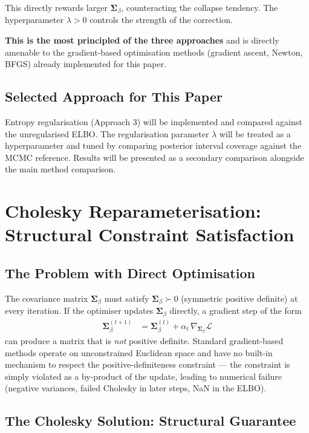\documentclass[11pt,a4paper]{article}
\begin{document}
This directly rewards larger $\bm{\Sigma}_\beta$, counteracting the collapse tendency. The hyperparameter $\lambda > 0$ controls the strength of the correction.

\textbf{This is the most principled of the three approaches} and is directly amenable to the gradient-based optimisation methods (gradient ascent, Newton, BFGS) already implemented for this paper.

\subsection*{Selected Approach for This Paper}

Entropy regularisation (Approach 3) will be implemented and compared against the unregularised ELBO. The regularisation parameter $\lambda$ will be treated as a hyperparameter and tuned by comparing posterior interval coverage against the MCMC reference. Results will be presented as a secondary comparison alongside the main method comparison.



\section{Cholesky Reparameterisation: Structural Constraint Satisfaction}\label{app:cholesky}

\subsection*{The Problem with Direct Optimisation}

The covariance matrix $\bm{\Sigma}_\beta$ must satisfy $\bm{\Sigma}_\beta \succ 0$ (symmetric positive definite) at every iteration. If the optimiser updates $\bm{\Sigma}_\beta$ directly, a gradient step of the form
\begin{align}
  \bm{\Sigma}_\beta^{(t+1)} &= \bm{\Sigma}_\beta^{(t)} + \alpha_t \,\nabla_{\bm{\Sigma}_\beta}\mathcal{L}
\end{align}
can produce a matrix that is \emph{not} positive definite. Standard gradient-based methods operate on unconstrained Euclidean space and have no built-in mechanism to respect the positive-definiteness constraint --- the constraint is simply violated as a by-product of the update, leading to numerical failure (negative variances, failed Cholesky in later steps, NaN in the ELBO).

\subsection*{The Cholesky Solution: Structural Guarantee}
\end{document}
